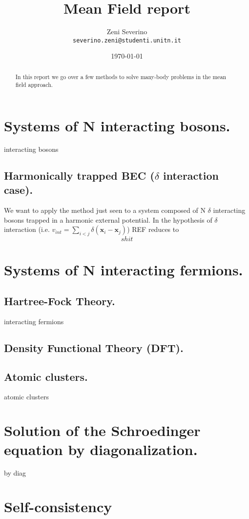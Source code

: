 \documentclass[a4paper]{article}
\title{Mean Field report}
\author{Zeni Severino\\
\texttt{severino.zeni@studenti.unitn.it}}
\date{\today}
\begin{document}
\maketitle

\begin{abstract}
  In this report we go over a few methods to solve many-body problems in the mean field approach.
\end{abstract}

\section{Systems of N interacting bosons.}
interacting bosons


 
\subsection{Harmonically trapped BEC ($ \delta $ interaction case).}
We want to apply the method just seen to a system composed of N $ \delta $ interacting bosons trapped in a harmonic external potential.
In the hypothesis of $ \delta $ interaction (i.e. $ v_{int} = \sum_{i < j} \delta(\mathbf{x}_i - \mathbf{x}_j) $) REF reduces to
\begin{equation}
  shit
\end{equation}

\section{Systems of N interacting fermions.}

\subsection{Hartree-Fock Theory.}
interacting fermions

\subsection{Density Functional Theory (DFT).}

\subsection{Atomic clusters.}%
atomic clusters

\appendix
\section{Solution of the Schroedinger equation by diagonalization.}
by diag

\appendix
\section{Self-consistency}
\end{document}
